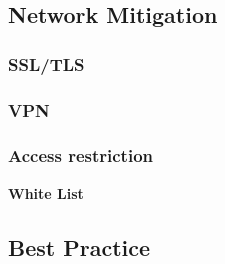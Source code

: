\documentclass[twosided,a4,10pt]{article}
\begin{document}
\begin{multicols}{2}
 
\subsection{Network Mitigation}
 \subsubsection{SSL/TLS}
 \lipsum[1]
 \subsubsection{VPN}
 \lipsum[1]
 \subsubsection{Access restriction}
 \textbf{White List}
 \lipsum[1]
 
\subsection{Best Practice}
 \lipsum[2]

 
 


\end{multicols}
\end{document}
